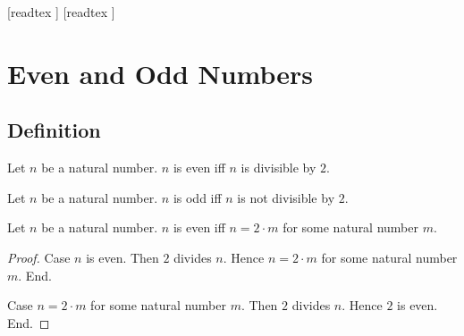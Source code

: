 \documentclass[10pt]{article}
\begin{document}
  \begin{imports}
    \begin{forthel}
      [readtex ]
      [readtex ]
    \end{forthel}
  \end{imports}


  \section*{Even and Odd Numbers}

  \subsection*{Definition}

  \begin{forthel}
    \begin{definition}
      Let $n$ be a natural number.
      $n$ is even iff $n$ is divisible by $2$.
    \end{definition}
  \end{forthel}

  \begin{forthel}
    \begin{definition}
      Let $n$ be a natural number.
      $n$ is odd iff $n$ is not divisible by $2$.
    \end{definition}
  \end{forthel}

  \begin{forthel}
    \begin{proposition}
      Let $n$ be a natural number.
      $n$ is even iff $n = 2 \cdot m$ for some natural number $m$.
    \end{proposition}
    \begin{proof}
      Case $n$ is even.
        Then $2$ divides $n$.
        Hence $n = 2 \cdot m$ for some natural number $m$.
      End.

      Case $n = 2 \cdot m$ for some natural number $m$.
        Then $2$ divides $n$.
        Hence $2$ is even.
      End.
    \end{proof}
  \end{forthel}
\end{document}
